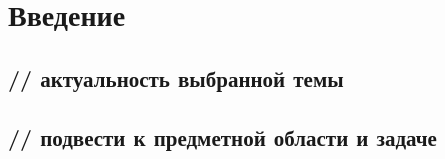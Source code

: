 \chapter{Введение}

%
\section{// актуальность выбранной темы}

%
\section{// подвести к предметной области и задаче}
